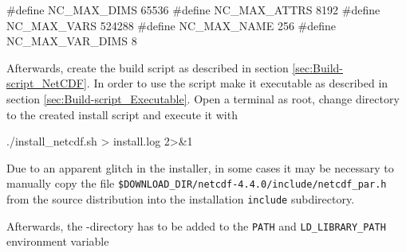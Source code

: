 \begingroup
\lstset{keepspaces=true}
\begin{code}
#define NC_MAX_DIMS      65536
#define NC_MAX_ATTRS      8192
#define NC_MAX_VARS     524288
#define NC_MAX_NAME        256
#define NC_MAX_VAR_DIMS      8
\end{code}
\endgroup

Afterwards, create the \marktool{\netcdfname} build script as described in section \ref{sec:Build-script_NetCDF}. In order to use the script make it executable as described in section \ref{sec:Build-script_Executable}. Open a terminal as root, change directory to the created install script and execute it with

\begin{code}
./install_netcdf.sh > install.log 2>&1
\end{code}

Due to an apparent glitch in the \marktool{\netcdfname} installer, in some cases it may be necessary to manually copy the file \verb+$DOWNLOAD_DIR/netcdf-4.4.0/include/netcdf_par.h+ from the source distribution into the installation \verb+include+ subdirectory.

\begingroup
\lstset{breaklines=true}
\endgroup

Afterwards, the \marktool{\netcdfname}-directory has to be added to the \verb+PATH+ and \verb+LD_LIBRARY_PATH+ environment variable

\begingroup
\lstset{breaklines = true}

\endgroup 